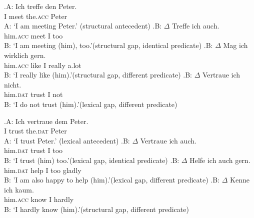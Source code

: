 \largerpage
\exg.\label{ex:trutkowski.exp.1}A: Ich treffe den Peter.\\
{} I meet the.\textsc{acc} Peter\\
A: `I am meeting Peter.' \hfill (structural antecedent)
\ag.\label{ex:trutkowski.exp.1.match}B: $\Delta$ Treffe ich auch.\\
{} him.\textsc{acc} meet I too\\
B: `I am meeting (him), too.'\hfill(structural gap, identical predicate)
\bg.\label{ex:trutkowski.exp.1.smatch}B: $\Delta$ Mag ich wirklich gern.\\
{} him.\textsc{acc} like I really a.lot\\
B: `I really like (him).'\hfill(structural gap, different predicate)
\cg.\label{ex:trutkowski.exp.1.mmatch}B: $\Delta$ Vertraue ich nicht.\\
{} him.\textsc{dat} trust I not\\
B: `I do not trust (him).'\hfill(lexical gap, different predicate)

\exg.\label{ex:trutkowski.exp.2}A: Ich vertraue dem Peter.\\
{} I trust the.\textsc{dat} Peter\\
A: `I trust Peter.' \hfill (lexical antecedent)
\ag.\label{ex:trutkowski.exp.2.match}B: $\Delta$ Vertraue ich auch.\\
{} him.\textsc{dat} trust I too\\
B: `I trust (him) too.'\hfill(lexical gap, identical predicate)
\bg.\label{ex:trutkowski.exp.2.smatch}B: $\Delta$ Helfe ich auch gern.\\
{} him.\textsc{dat} help I too gladly\\
B: 'I am also happy to help (him).'\hfill(lexical gap, different predicate)
\cg.\label{ex:trutkowski.exp.2.mmatch}B: $\Delta$ Kenne ich kaum.\\
{} him.\textsc{acc} know I hardly\\
B: `I hardly know (him).'\hfill(structural gap, different predicate)\\
\phantom{.} \hfill \citep[3, adapted]{trutkowski2018}

